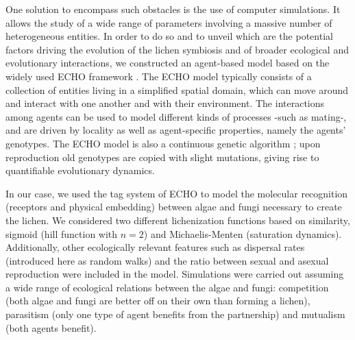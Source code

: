 \documentclass[runningheads,a4paper]{llncs}
\begin{document}
%

One solution to encompass such obstacles is the use of computer simulations. It allows the study of a wide range of parameters involving a massive number of heterogeneous entities. 
In order to do so and to unveil which are the potential factors driving the evolution of the lichen symbiosis and of broader ecological and evolutionary interactions, we constructed an agent-based model based on the widely used ECHO framework \cite{holland1999echoing,holland1995hidden}. The ECHO model typically consists of a collection of entities living in a simplified spatial domain, which can move around and interact with one another and with their environment. The interactions among agents can be used to model different kinds of processes -such as mating-, and are driven by locality as well as agent-specific properties, namely the agents' genotypes. The ECHO model is also a continuous genetic algorithm \cite{mitchell1998introduction}; upon reproduction old genotypes are copied with slight mutations, giving rise to quantifiable evolutionary dynamics.

In our case, we used the tag system of ECHO to model the molecular recognition (receptors and physical embedding) between algae and fungi necessary to create the lichen. We considered two different lichenization functions based on similarity, sigmoid (hill function with $n=2$) and Michaelis-Menten (saturation dynamics). Additionally, other ecologically relevant features such as dispersal rates (introduced here as random walks) and the ratio between sexual and asexual reproduction were included in the model. Simulations were carried out assuming a wide range of ecological relations between the algae and fungi: competition (both algae and fungi are better off on their own than forming a lichen), parasitism (only one type of agent benefits from the partnership) and mutualism (both agents benefit).
\end{document}
